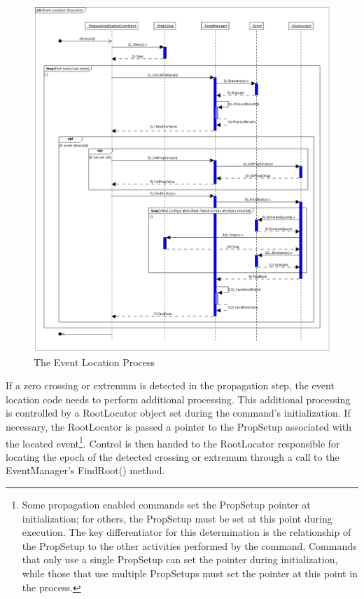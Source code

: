 \begin{figure}
\begin{center}
\includegraphics[scale=0.44]{Images/EventLocationExecution.eps}
\caption{\label{fig:EventLocationSD}The Event Location Process}
\end{center}
\end{figure}

If a zero crossing or extremum is detected in the propagation step, the event location code needs to perform additional processing.  This additional processing is controlled by a RootLocator object set during the command's initialization.  If necessary, the RootLocator is passed a pointer to the PropSetup associated with the located event\footnote{Some propagation enabled commands set the PropSetup pointer at initialization; for others, the PropSetup must be set at this point during execution.  The key differentiator for this determination is the relationship of the PropSetup to the other activities performed by the command.  Commands that only use a single PropSetup can set the pointer during initialization, while those that use multiple PropSetups must set the pointer at this point in the process.}.  Control is then handed to the RootLocator responsible for locating the epoch of the detected crossing or extremum through a call to the EventManager's FindRoot() method.

